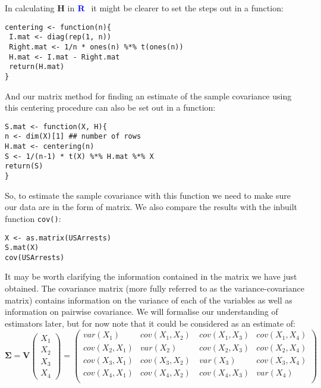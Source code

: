 In calculating $\boldsymbol{H}$ in $\textbf{\color{blue}{R}\ }$ it might be clearer to set the steps out in a function:
\singlespacing
\begin{verbatim}
centering <- function(n){
 I.mat <- diag(rep(1, n)) 
 Right.mat <- 1/n * ones(n) %*% t(ones(n))
 H.mat <- I.mat - Right.mat
 return(H.mat)
}
\end{verbatim}
\onehalfspacing

And our matrix method for finding an estimate of the sample covariance using this centering procedure can also be set out in a function:
\singlespacing
\begin{verbatim}
S.mat <- function(X, H){
n <- dim(X)[1] ## number of rows
H.mat <- centering(n)
S <- 1/(n-1) * t(X) %*% H.mat %*% X
return(S)
}
\end{verbatim}
\onehalfspacing

So, to estimate the sample covariance with this function we need to make sure our data are in the form of matrix.   We also compare the results with the inbuilt function \verb+cov()+:
\singlespacing
\begin{verbatim}
X <- as.matrix(USArrests)
S.mat(X)
cov(USArrests)
\end{verbatim}
\onehalfspacing

It may be worth clarifying the information contained in the matrix we have just obtained.   The covariance matrix (more fully referred to as the variance-covariance matrix) contains information on the variance of each of the variables as well as information on pairwise covariance.   We will formalise our understanding of estimators later, but for now note that it could be considered as an estimate of:
\begin{displaymath}
\boldsymbol{\Sigma} = \boldsymbol{V} \left( 
\begin{array}{c} 
X_{1} \\ X_{2} \\ X_{3} \\ X_{4}
\end{array} \right) = 
\left( 
\begin{array}{llll}
var(X_{1}) & cov(X_{1},X_{2})  & cov(X_{1},X_{3}) & cov(X_{1},X_{4})\\
cov(X_{2},X_{1}) & var(X_{2}) & cov(X_{2},X_{3}) & cov(X_{2},X_{4})\\
cov(X_{3},X_{1})  & cov(X_{3},X_{2})\ & var(X_{3}) & cov(X_{3},X_{4})\\
cov(X_{4},X_{1})  & cov(X_{4},X_{2})\ &  cov(X_{4},X_{3}) & var(X_{4}) \\
\end{array} 
\right)
\end{displaymath}



